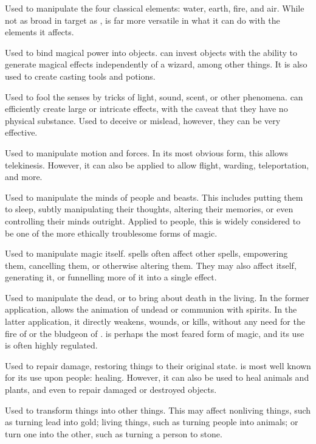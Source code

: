 
Used to manipulate the four classical elements: water, earth, fire, and air.
While not as broad in target as ,  is far more versatile in what it can do with the elements it affects.


Used to bind magical power into objects.
 can invest objects with the ability to generate magical effects independently of a wizard, among other things.
It is also used to create casting tools and potions.


Used to fool the senses by tricks of light, sound, scent, or other phenomena.
 can efficiently create large or intricate effects, with the caveat that they have no physical substance.
Used to deceive or mislead, however, they can be very effective.


Used to manipulate motion and forces.
In its most obvious form, this allows telekinesis.
However, it can also be applied to allow flight, warding, teleportation, and more.


Used to manipulate the minds of people and beasts.
This includes putting them to sleep, subtly manipulating their thoughts, altering their memories, or even controlling their minds outright.
Applied to people, this is widely considered to be one of the more ethically troublesome forms of magic.


Used to manipulate magic itself.
 spells often affect other spells, empowering them, cancelling them, or otherwise altering them.
They may also affect {\mana} itself, generating it, or funnelling more of it into a single effect.


Used to manipulate the dead, or to bring about death in the living.
In the former application,  allows the animation of undead or communion with spirits.
In the latter application, it directly weakens, wounds, or kills, without any need for the fire of  or the bludgeon of .
 is perhaps the most feared form of magic, and its use is often highly regulated.


Used to repair damage, restoring things to their original state.
 is most well known for its use upon people: healing.
However, it can also be used to heal animals and plants, and even to repair damaged or destroyed objects.


Used to transform things into other things.
This may affect nonliving things, such as turning lead into gold; living things, such as turning people into animals; or turn one into the other, such as turning a person to stone.
